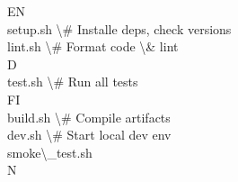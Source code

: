 \documentclass[12pt,landscape,a4paper]{article}
\begin{document}
EN\\
setup.sh                  \textbackslash{}# Installe deps, check versions\\
lint.sh                   \textbackslash{}# Format code \textbackslash{}& lint\\
\vspace{0.5em}
\vspace{0.5em}
\vspace{0.5em}
\vspace{0.5em}
D\\
test.sh                   \textbackslash{}# Run all tests\\
\vspace{0.5em}
\vspace{0.5em}
\vspace{0.5em}
\vspace{0.5em}
FI\\
build.sh                  \textbackslash{}# Compile artifacts\\
dev.sh                    \textbackslash{}# Start local dev env\\
smoke\textbackslash{}_test.sh\\
N\\
\end{document}
